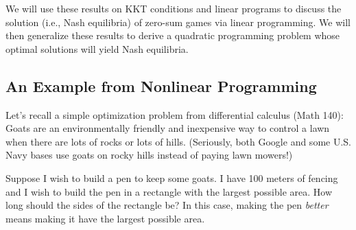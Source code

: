 \begin{remark} We will use these results on KKT conditions and linear programs to discuss the solution (i.e., Nash equilibria) of zero-sum games via linear programming. We will then generalize these results to derive a quadratic programming problem whose optimal solutions will yield Nash equilibria. 
\end{remark}

\subsection{An Example from Nonlinear Programming}
Let's recall a simple optimization problem from differential calculus (Math 140): Goats are an environmentally friendly and inexpensive way to control a lawn when there are lots of rocks or lots of hills. (Seriously, both Google and some U.S. Navy bases use goats on rocky hills instead of paying lawn mowers!) 

Suppose I wish to build a pen to keep some goats. I have 100 meters of fencing and I wish to build the pen in a rectangle with the largest possible area. How long should the sides of the rectangle be? In this case, making the pen \textit{better} means making it have the largest possible area.

